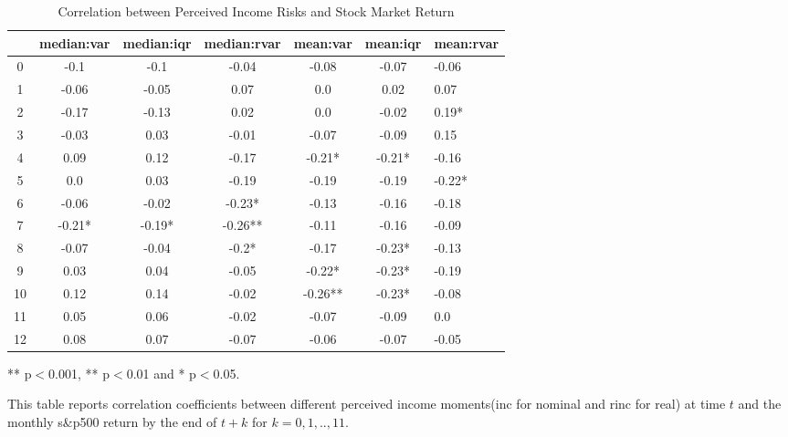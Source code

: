 
\begin{table}[ht]
\centering
\begin{adjustbox}{width={\textwidth}}
\begin{threeparttable}
\caption{Correlation between Perceived Income Risks and Stock Market Return}
\label{macro_corr}
\begin{tabular}{ccccccl}
\toprule
{} & median:var & median:iqr & median:rvar & mean:var & mean:iqr & mean:rvar \\
\midrule
0  &       -0.1 &       -0.1 &       -0.04 &    -0.08 &    -0.07 &     -0.06 \\
1  &      -0.06 &      -0.05 &        0.07 &      0.0 &     0.02 &      0.07 \\
2  &      -0.17 &      -0.13 &        0.02 &      0.0 &    -0.02 &     0.19* \\
3  &      -0.03 &       0.03 &       -0.01 &    -0.07 &    -0.09 &      0.15 \\
4  &       0.09 &       0.12 &       -0.17 &   -0.21* &   -0.21* &     -0.16 \\
5  &        0.0 &       0.03 &       -0.19 &    -0.19 &    -0.19 &    -0.22* \\
6  &      -0.06 &      -0.02 &      -0.23* &    -0.13 &    -0.16 &     -0.18 \\
7  &     -0.21* &     -0.19* &     -0.26** &    -0.11 &    -0.16 &     -0.09 \\
8  &      -0.07 &      -0.04 &       -0.2* &    -0.17 &   -0.23* &     -0.13 \\
9  &       0.03 &       0.04 &       -0.05 &   -0.22* &   -0.23* &     -0.19 \\
10 &       0.12 &       0.14 &       -0.02 &  -0.26** &   -0.23* &     -0.08 \\
11 &       0.05 &       0.06 &       -0.02 &    -0.07 &    -0.09 &       0.0 \\
12 &       0.08 &       0.07 &       -0.07 &    -0.06 &    -0.07 &     -0.05 \\
\bottomrule
\end{tabular}
\begin{tablenotes}
\item *** p$<$0.001, ** p$<$0.01 and * p$<$0.05.
\item This table reports correlation coefficients between different perceived income moments(inc for nominal
and rinc for real) at time
$t$ and the monthly s\&p500 return by the end of $t+k$ for $k=0,1,..,11$.
\end{tablenotes}
\end{threeparttable}
\end{adjustbox}
\end{table}